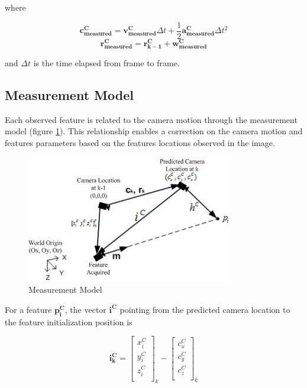 \noindent where 

$$\mathbf{c_{measured}^{C}}=\mathbf{v_{measured}^{C}}\Delta t+ 
\frac{1}{2}\mathbf{a_{measured}^{C}}\Delta t^{2}$$
$$\mathbf{r_{measured}^{C}}=\mathbf{r_{k-1}^{C}}+ \mathbf{w_{measured}^{C}}$$

\noindent and $\Delta t$ is the time elapsed from frame to frame. 

\subsection{Measurement Model}

Each observed feature is related to the camera motion through the
measurement model (figure \ref{fig:measurement_model}). This
relationship enables a correction on the camera motion and features
parameters based on the features locations observed in the image.

\begin{figure}[h]
\centering
\includegraphics[width=9cm, keepaspectratio=true]{./Figures/measurement_model.jpg}
\caption{Measurement Model}
\label{fig:measurement_model}
\end{figure}
\FloatBarrier
For a feature $\mathbf{p_{i}^{C}}$, the vector $\mathbf{i^{C}}$
pointing from the predicted camera location to the feature
initialization position is

\begin{equation}
\mathbf{i_{k}^{C}}=\begin{bmatrix}
x_{i}^{C} \\
y_{i}^{C} \\
z_{i}^{C} \\
\end{bmatrix}_{k}-\begin{bmatrix}
c_{x}^{C} \\
c_{y}^{C} \\
c_{z}^{C} \\
\end{bmatrix}_{k}
\end{equation}

